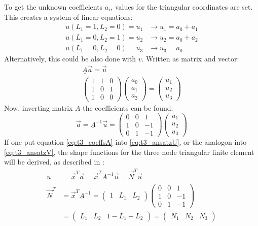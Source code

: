 \documentclass[11pt,twoside]{scrartcl}
\begin{document}
  To get the unknown coefficients $a_i$, values for the triangular coordinates are set. This creates a system of linear equations:
  \begin{align}
  u(L_1=1, L_2=0) = u_1 &\rightarrow u_1 = a_0 + a_1 \nonumber\\
  u(L_1=0, L_2=1) = u_2 &\rightarrow u_2 = a_0 + a_2 \nonumber\\
  u(L_1=0, L_2=0) = u_3 &\rightarrow u_3 = a_0
  \end{align}
  Alternatively, this could be also done with $v$. Written as matrix and vector:
  \begin{align}
  \underline{A} \vec{a} = \vec{u} \nonumber\\
  \begin{pmatrix}
  1 & 1 & 0\\
  1 & 0 & 1\\
  1 & 0 & 0
  \end{pmatrix} \begin{pmatrix}
  a_0 \\ a_1 \\ a_2
  \end{pmatrix} = \begin{pmatrix}
  u_1 \\ u_2 \\ u_3
  \end{pmatrix}
  \end{align}
  Now, inverting matrix $A$ the coefficients can be found:
  \begin{equation}\label{eq:t3_coeffsA}
  \vec{a} = \underline{A}^{-1} \vec{u} = \begin{pmatrix}
  0 & 0 & 1\\
  1 & 0 & -1\\
  0 & 1 & -1
  \end{pmatrix} \begin{pmatrix}
  u_1 \\ u_2 \\ u_3
  \end{pmatrix}
  \end{equation}
  If one put equation \ref{eq:t3_coeffsA} into \ref{eq:t3_ansatzU}, or the analogon into \ref{eq:t3_ansatzV}, the shape functions for the three node triangular finite element will be derived, as described in \cite{steinke2005finite}:
  \begin{align}\label{eq:t3SF}
  u &= \vec{x}^T \vec{a} = \vec{x}^T \underline{A}^{-1}\vec{u} = \vec{N}^T\vec{u} \nonumber\\
  \vec{N}^T &= \vec{x}^T \underline{A}^{-1} =
  \begin{pmatrix}
  1 & L_1 & L_2
  \end{pmatrix} \begin{pmatrix}
  0 & 0 & 1\\
  1 & 0 & -1\\
  0 & 1 & -1
  \end{pmatrix} \nonumber\\
  &= \begin{pmatrix}
  L_1 & L_2 & 1-L_1-L_2
  \end{pmatrix} = \begin{pmatrix}
  N_1 & N_2 & N_3
  \end{pmatrix}
  \end{align}
\end{document}
